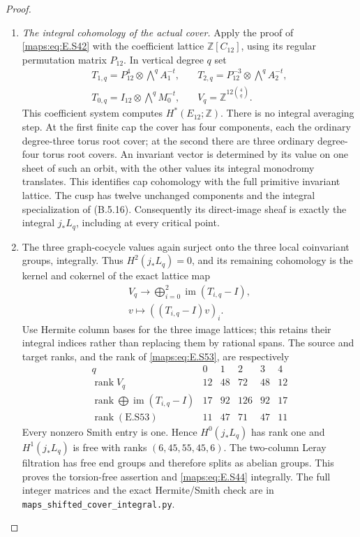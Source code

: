 \begin{proof}
\begin{enumerate}[label=\arabic*.,leftmargin=*]
\item \emph{The integral cohomology of the actual cover.}
Apply the proof of \eqref{maps:eq:E.S42} with the coefficient lattice
$\mathbb Z[C_{12}]$, using its regular permutation matrix
$P_{12}$. In vertical degree $q$ set
\[
 \begin{aligned}
 T_{1,q}=P_{12}^4\otimes\bigwedge^q A_1^{-t},\quad
 &T_{2,q}=P_{12}^{-3}\otimes\bigwedge^q A_2^{-t},\\
 T_{0,q}=I_{12}\otimes\bigwedge^q M_0^{-t},
 &V_q=\mathbb Z^{12\binom4q}.
 \end{aligned}
 \tag{E.S52}\label{maps:eq:E.S52}
\]
This coefficient system computes $H^*(E_{12};\mathbb Z)$.
There is no integral averaging step. At the first finite
cap the cover has four components, each the ordinary
degree-three torus root cover; at the second there are
three ordinary degree-four torus root covers. An invariant
vector is determined by its value on one sheet of such
an orbit, with the other values its integral monodromy
translates. This identifies cap cohomology with the full
primitive invariant lattice. The cusp has twelve unchanged
components and the integral specialization of (B.5.16).
Consequently its direct-image sheaf is exactly the integral
$j_*L_q$, including at every critical point.

\item The three graph-cocycle values again surject onto the
three local coinvariant groups, integrally. Thus $H^2(j_*L_q)=0$,
and its remaining cohomology is the kernel and cokernel
of the exact lattice map
\[
 \begin{gathered}
 V_q\longrightarrow
        \bigoplus_{i=0}^2\operatorname{im}(T_{i,q}-I),\\
           v\longmapsto((T_{i,q}-I)v)_i.
 \end{gathered}
 \tag{E.S53}\label{maps:eq:E.S53}
\]
Use Hermite column bases for the three image lattices;
this retains their integral indices rather than replacing
them by rational spans. The source and target ranks,
and the rank of \eqref{maps:eq:E.S53}, are respectively
\[
 \begin{array}{c|rrrrr}
 q&0&1&2&3&4\\ \hline
 \operatorname{rank}V_q&12&48&72&48&12\\
 \operatorname{rank}\bigoplus\operatorname{im}(T_{i,q}-I)
                      &17&92&126&92&17\\
 \operatorname{rank}(\text{E.S53})&11&47&71&47&11
 \end{array}
 \tag{E.S54}\label{maps:eq:E.S54}
\]
Every nonzero Smith entry is one. Hence $H^0(j_*L_q)$
has rank one and $H^1(j_*L_q)$ is free with ranks
$(6,45,55,45,6)$. The two-column Leray filtration has
free end groups and therefore splits as abelian groups.
This proves the torsion-free assertion and \eqref{maps:eq:E.S44}
integrally. The full integer matrices and the exact
Hermite/Smith check are in
\texttt{maps\_shifted\_cover\_integral.py}.


\end{enumerate}
\end{proof}
